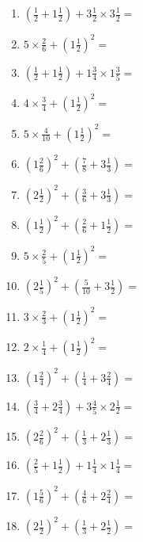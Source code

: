 \documentclass[12pt]{article}
\begin{document}
\begin{enumerate}
\item \large $ (\frac{1}{2} + 1 \frac{1}{2}) + 3 \frac{1}{2} \times 3 \frac{1}{2} = $ \vspace{1.8cm}
\item \large $ 5 \times \frac{2}{6} + (1 \frac{1}{2})^2 = $ \vspace{1.8cm}
\item \large $ (\frac{1}{2} + 1 \frac{1}{2}) + 1 \frac{3}{4} \times 1 \frac{3}{5} = $ \vspace{1.8cm}
\item \large $ 4 \times \frac{3}{4} + (1 \frac{1}{2})^2 = $ \vspace{1.8cm}
\item \large $ 5 \times \frac{4}{10} + (1 \frac{1}{2})^2 = $ \vspace{1.8cm}
\item \large $ (1 \frac{2}{6})^2 + (\frac{7}{8} + 3 \frac{1}{3}) = $ \vspace{1.8cm}
\item \large $ (2 \frac{1}{2})^2 + (\frac{3}{6} + 3 \frac{1}{3}) = $ \vspace{1.8cm}
\item \large $ (1 \frac{1}{2})^2 + (\frac{2}{6} + 1 \frac{1}{2}) = $ \vspace{1.8cm}
\newpage
\item \large $ 5 \times \frac{2}{5} + (1 \frac{1}{2})^2 = $ \vspace{1.8cm}
\item \large $ (2 \frac{1}{5})^2 + (\frac{5}{10} + 3 \frac{1}{2}) = $ \vspace{1.8cm}
\item \large $ 3 \times \frac{2}{3} + (1 \frac{1}{2})^2 = $ \vspace{1.8cm}
\item \large $ 2 \times \frac{1}{4} + (1 \frac{1}{2})^2 = $ \vspace{1.8cm}
\item \large $ (1 \frac{2}{4})^2 + (\frac{1}{4} + 3 \frac{2}{4}) = $ \vspace{1.8cm}
\item \large $ (\frac{3}{4} + 2 \frac{3}{4}) + 3 \frac{4}{5} \times 2 \frac{1}{2} = $ \vspace{1.8cm}
\item \large $ (2 \frac{2}{6})^2 + (\frac{1}{3} + 2 \frac{1}{3}) = $ \vspace{1.8cm}
\item \large $ (\frac{2}{5} + 1 \frac{1}{2}) + 1 \frac{1}{4} \times 1 \frac{1}{4} = $ \vspace{1.8cm}
\item \large $ (1 \frac{5}{6})^2 + (\frac{4}{6} + 2 \frac{2}{4}) = $ \vspace{1.8cm}
\item \large $ (2 \frac{1}{2})^2 + (\frac{1}{3} + 2 \frac{1}{2}) = $ \vspace{1.8cm}
\end{enumerate}\newpage
\end{document}
